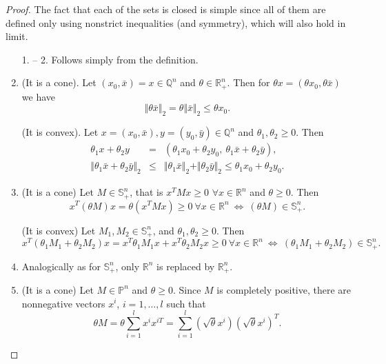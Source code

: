 \documentclass[12pt]{book}
\theoremstyle{definition}
\begin{document}
\begin{appendix}
\begin{proof}%
The fact that each of the sets is closed is simple since all of them are defined only using nonstrict inequalities (and symmetry), which will also hold in limit. %
\begin{enumerate}
\item[1. -- 2.] Follows simply from the definition.
\setcounter{enumi}{2}
\item (It is a cone). Let $(x_0,\bar{x})= x\in \mathbb{Q}^n$ and $\theta \in \mathbb{R}^n_+$.
Then for $\theta x = (\theta x_0, \theta\bar{x})$ we have  
$$\Vert \theta\bar{x}\Vert_2 = \theta \Vert \bar{x}\Vert_2 \leq \theta x_0.$$

(It is convex). Let $x=(x_0,\bar{x}),y=(y_0,\bar{y})\in\mathbb{Q}^n$ and $\theta_1, \theta_2 \geq 0$.
Then 
\begin{eqnarray*}
\theta_1x + \theta_2y &=& (\theta_1x_0+\theta_2y_0,\  \theta_1\bar{x} + \theta_2\bar{y}),  \\
\Vert \theta_1\bar{x} + \theta_2\bar{y} \Vert_2 &\leq & \Vert \theta_1\bar{x} \Vert_2 + \Vert \theta_2\bar{y} \Vert_2 \leq  \theta_1x_0+\theta_2y_0.
\end{eqnarray*}

\item (It is a cone) Let $M\in \mathbb{S}^n_+$, that is $x^TMx\geq 0$ $\forall x\in\mathbb{R}^n$ and $\theta \geq 0$. Then $$x^T(\theta M)x = \theta(x^TMx) \geq 0 \ \forall x\in\mathbb{R}^n \ \Leftrightarrow \ (\theta M) \in \mathbb{S}^n_+.$$

(It is convex)  Let $M_1, M_2\in \mathbb{S}^n_+$, and $\theta_1, \theta_2 \geq 0$. Then
$$x^T(\theta_1M_1 + \theta_2M_2)x = x^T\theta_1M_1x + x^T\theta_2M_2x \geq 0 \ \forall x\in\mathbb{R}^n \ \Leftrightarrow \ (\theta_1M_1 + \theta_2M_2) \in \mathbb{S}^n_+.$$

\item Analogically as for $\mathbb{S}^n_+$, only $\mathbb{R}^n$ is replaced by $\mathbb{R}^n_+$.

\item (It is a cone) Let $M\in \mathbb{P}^n$ and $\theta \geq 0$. Since $M$ is completely positive, there are nonnegative vectors $x^i$, $i = 1,\dots , l$ such that
$$ \theta M = \theta\sum_{i = 1}^l x^{i}x^{iT} = \sum_{i = 1}^l (\sqrt{\theta} x^{i})(\sqrt{\theta} x^{i})^T.$$


\end{enumerate}
\end{proof}
\end{appendix}
\end{document}
